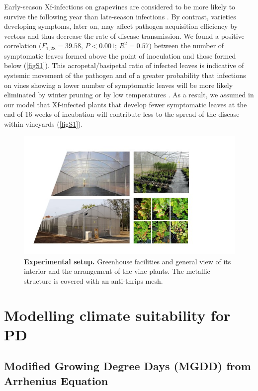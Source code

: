Early-season Xf-infections on grapevines are considered to be more likely to
survive the following year than late-season infections
\cite{Feil2001,Lieth2011}. By contrast, varieties developing symptoms, later
on, may affect pathogen acquisition efficiency by vectors and thus decrease the
rate of disease transmission. We found a positive correlation ($F_{1,28} =
    39.58$, $P < 0.001$; $R^2= 0.57$) between the number of symptomatic leaves
formed above the point of inoculation and those formed below (\cref{figS1}).
This acropetal/basipetal ratio of infected leaves is indicative of systemic
movement of the pathogen and of a greater probability that infections on vines
showing a lower number of symptomatic leaves will be more likely eliminated by
winter pruning or by low temperatures \cite{Daugherty2018}. As a result, we
assumed in our model that Xf-infected plants that develop fewer symptomatic
leaves at the end of 16 weeks of incubation will contribute less to the spread
of the disease within vineyards (\cref{figS1}).

\begin{figure}[H]
    \centering
    \includegraphics[width=1\textwidth]{Figures/Experimental setup.jpg}
    \caption{\textbf{Experimental setup.} Greenhouse facilities and general
        view of its interior and the arrangement of the vine plants. The
        metallic
        structure is covered with an anti-thrips mesh.}
    \label{fig:experimental_setup} %
\end{figure}

\section{Modelling climate suitability for PD}\label{app:S2}
\subsection{Modified Growing Degree Days (MGDD) from Arrhenius
    Equation}\label{app:MGDD} %

